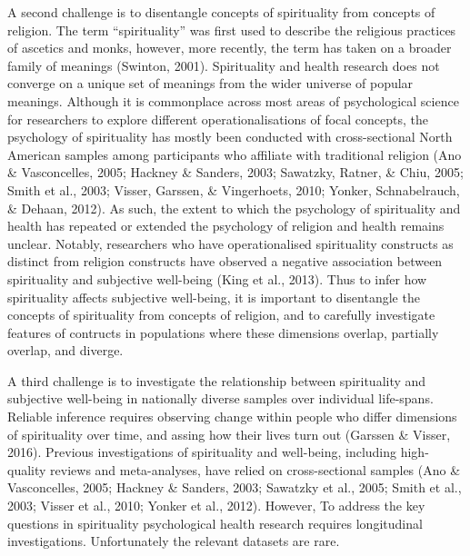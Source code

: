\documentclass[
  english,
  man]{apa6}
\begin{document}
A second challenge is to disentangle concepts of spirituality from concepts of religion. The term \enquote{spirituality} was first used to describe the religious practices of ascetics and monks, however, more recently, the term has taken on a broader family of meanings (Swinton, 2001). Spirituality and health research does not converge on a unique set of meanings from the wider universe of popular meanings. Although it is commonplace across most areas of psychological science for researchers to explore different operationalisations of focal concepts, the psychology of spirituality has mostly been conducted with cross-sectional North American samples among participants who affiliate with traditional religion (Ano \& Vasconcelles, 2005; Hackney \& Sanders, 2003; Sawatzky, Ratner, \& Chiu, 2005; Smith et al., 2003; Visser, Garssen, \& Vingerhoets, 2010; Yonker, Schnabelrauch, \& Dehaan, 2012). As such, the extent to which the psychology of spirituality and health has repeated or extended the psychology of religion and health remains unclear. Notably, researchers who have operationalised spirituality constructs as distinct from religion constructs have observed a negative association between spirituality and subjective well-being (King et al., 2013). Thus to infer how spirituality affects subjective well-being, it is important to disentangle the concepts of spirituality from concepts of religion, and to carefully investigate features of contructs in populations where these dimensions overlap, partially overlap, and diverge.

A third challenge is to investigate the relationship between spirituality and subjective well-being in nationally diverse samples over individual life-spans. Reliable inference requires observing change within people who differ dimensions of spirituality over time, and assing how their lives turn out (Garssen \& Visser, 2016). Previous investigations of spirituality and well-being, including high-quality reviews and meta-analyses, have relied on cross-sectional samples (Ano \& Vasconcelles, 2005; Hackney \& Sanders, 2003; Sawatzky et al., 2005; Smith et al., 2003; Visser et al., 2010; Yonker et al., 2012). However, To address the key questions in spirituality psychological health research requires longitudinal investigations. Unfortunately the relevant datasets are rare.
\end{document}
